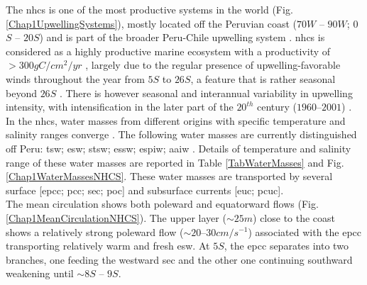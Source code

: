 The \acrshort{nhcs} is one of the most productive systems in the world (Fig. \ref{Chap1UpwellingSystems}), mostly located off the Peruvian coast ($70$\textdegree $W$ – $90$\textdegree $W$; $0$\textdegree $S$ – $20$\textdegree $S$) and is part of the broader Peru-Chile upwelling system \citep{GradChai2018,TaraArnt2001}. \acrshort{nhcs} is considered as a highly productive marine ecosystem with a productivity of $>300gC/cm^{2}/yr$ \citep{KampCap5}, largely due to the regular presence of upwelling-favorable winds throughout the year from $5$\textdegree $S$ to $26$\textdegree $S$, a feature that is rather seasonal beyond $26$\textdegree $S$ \citep{BelmEche2014}. There is however seasonal and interannual variability in upwelling intensity, with intensification in the later part of the $20^{th}$ century ($1960 – 2001$) \citep{NaraPaul2010}.\\

In the \acrshort{nhcs}, water masses from different origins with specific temperature and salinity ranges converge \citep{SilvRoja2009,MontCola2010,ChaiDomi2013}. The following water masses are currently distinguished off Peru: \acrfull{tsw}; \acrfull{esw}; \acrfull{stsw}; \acrfull{essw}; \acrfull{espiw}; \acrfull{aaiw} \citep{GradChai2018}. Details of temperature and salinity range of these water masses are reported in Table \ref{TabWaterMasses} and Fig. \ref{Chap1WaterMassesNHCS}. These water masses are transported by several surface [\acrfull{epcc}; \acrfull{pcc}; \acrfull{sec}; \acrfull{poc}] and subsurface currents [\acrfull{euc}; \acrfull{pcuc}].\\

The mean circulation shows both poleward and equatorward flows (Fig. \ref{Chap1MeanCirculationNHCS}). The upper layer ($\sim 25m$) close to the coast shows a relatively strong poleward flow ($\sim 20 – 30 cm/s^{-1}$) associated with the \acrshort{epcc} transporting relatively warm and fresh \acrshort{esw}. At $5$\textdegree $S$, the \acrshort{epcc} separates into two branches, one feeding the westward \acrshort{sec} and the other one continuing southward weakening until $\sim 8$\textdegree $S$ – $9$\textdegree $S$.\\


